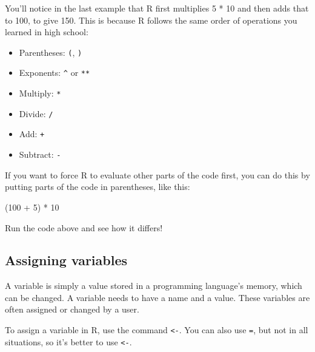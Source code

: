 \documentclass[
  letterpaper,
  DIV=11,
  numbers=noendperiod]{scrreprt}
\newenvironment{Shaded}{\begin{snugshade}}{\end{snugshade}}
\newcommand{\NormalTok}[1]{\textcolor[rgb]{0.00,0.23,0.31}{#1}}
\begin{document}
\begin{tcolorbox}[enhanced jigsaw, coltitle=black, bottomrule=.15mm, title=\textcolor{quarto-callout-note-color}{\faInfo}\hspace{0.5em}{More on the order of operations, if you're interested}, leftrule=.75mm, colframe=quarto-callout-note-color-frame, breakable, toprule=.15mm, opacityback=0, bottomtitle=1mm, toptitle=1mm, colback=white, rightrule=.15mm, titlerule=0mm, left=2mm, arc=.35mm, opacitybacktitle=0.6, colbacktitle=quarto-callout-note-color!10!white]

You'll notice in the last example that R first multiplies 5 * 10 and
then adds that to 100, to give 150. This is because R follows the same
order of operations you learned in high school:

\begin{itemize}
\item
  Parentheses: \texttt{(}, \texttt{)}
\item
  Exponents: \texttt{\^{}} or \texttt{**}
\item
  Multiply: \texttt{*}
\item
  Divide: \texttt{/}
\item
  Add: \texttt{+}
\item
  Subtract: \texttt{-}
\end{itemize}

If you want to force R to evaluate other parts of the code first, you
can do this by putting parts of the code in parentheses, like this:

\begin{Shaded}
\begin{Highlighting}[]
\NormalTok{(100 + 5) * 10}
\end{Highlighting}
\end{Shaded}

Run the code above and see how it differs!

\end{tcolorbox}

\subsection{Assigning variables}\label{assigning-variables}

A variable is simply a value stored in a programming language's memory,
which can be changed. A variable needs to have a name and a value. These
variables are often assigned or changed by a user.

To assign a variable in R, use the command \texttt{\textless{}-}. You
can also use \texttt{=}, but not in all situations, so it's better to
use \texttt{\textless{}-}.
\end{document}
